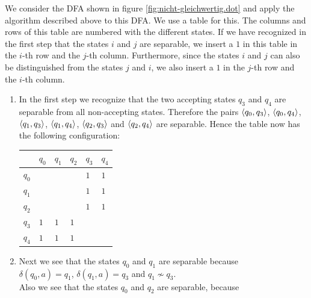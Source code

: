 \exerciseEng
We consider the  \textsc{DFA} shown in figure \ref{fig:nicht-gleichwertig.dot} and apply the algorithm
described above to this \textsc{DFA}. 
We use a table for this.  The columns and rows of this table are numbered with the different states.  If we
have recognized in the first step that the states $i$ and $j$ are separable, we insert a $1$ in this
table in the $i$-th row and the $j$-th column. 
Furthermore, since the states $i$ and $j$ can also be distinguished from the states $j$ and $i$, we also insert
a $1$ in the $j$-th row and the $i$-th column. 
\begin{enumerate}
\item In the first step we recognize that the two accepting states $q_3$ and $q_4$ are separable from all non-accepting states.
      Therefore the pairs 
      $\pair(q_0,q_3)$,
      $\pair(q_0,q_4)$,
      $\pair(q_1,q_3)$,
      $\pair(q_1,q_4)$,
      $\pair(q_2,q_3)$ and
      $\pair(q_2,q_4)$
      are separable. Hence the table now has the following configuration:
      \begin{center}        
      \begin{tabular}[t]{|l||l|l|l|l|l|}
      \hline
            & $q_0$    &    $q_1$ &    $q_2$ &      $q_3$ &      $q_4$  \\
      \hline
      \hline
      $q_0$ &          &          &          & $1$ & $1$  \\
      \hline
      $q_1$ &          &          &          &$1$ &$1$  \\
      \hline
      $q_2$ &          &          &          &$1$ &$1$  \\
      \hline
      $q_3$ &$1$        &$1$         &       $1$ &          &           \\
      \hline
      $q_4$ &$1$ &$1$ &$1$ &          &           \\
      \hline
      \end{tabular}
      \end{center}
\item Next we see that the states $q_0$ and $q_1$ are separable because
      \\[0.2cm]
      \hspace*{1.3cm}
      $\delta(q_0,a) = q_1$, \quad $\delta(q_1,a) = q_3$ \quad and \quad $q_1 \not\sim q_3$.
      \\[0.2cm]
      Also we see that the states $q_0$ and $q_2$ are separable, because
      \\[0.2cm]
      \hspace*{1.3cm}

\end{enumerate}
